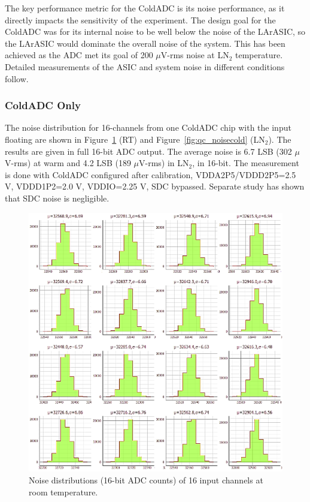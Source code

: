 \label{sec:4.1}

The key performance metric for the ColdADC is its noise performance, as it directly impacts the 
sensitivity of the experiment. The design goal for the ColdADC was for its internal noise to be well 
below the noise of the LArASIC, so the LArASIC would dominate the overall noise of the system. 
This has been achieved as the ADC met its goal of 200 $\mu$V-rms noise at LN$_2$ temperature. 
Detailed measurements of the ASIC and system noise in different conditions follow.

\subsubsection{ColdADC Only}
The noise distribution for 16-channels from one ColdADC chip with the input floating are shown in Figure~\ref{fig:qc_noisewarm} (RT) and Figure~\ref{fig:qc_noisecold} (LN$_2$). The results are given in full 16-bit ADC output. The average noise is 6.7 LSB (302 $\mu$V-rms) at warm and 4.2 LSB (189 $\mu$V-rms) in LN$_2$, in 16-bit. The measurement is done with ColdADC configured after calibration, VDDA2P5/VDDD2P5=2.5 V, VDDD1P2=2.0 V, VDDIO=2.25 V, SDC bypassed. Separate study has shown that SDC noise is negligible. 
\begin{figure}[h!]
\centering
  \includegraphics[width=0.8\linewidth]{figures/qc_noisewarm.png}
  \caption{Noise distributions (16-bit ADC counts) of 16 input channels at room temperature.}
  \label{fig:qc_noisewarm}
\end{figure}
